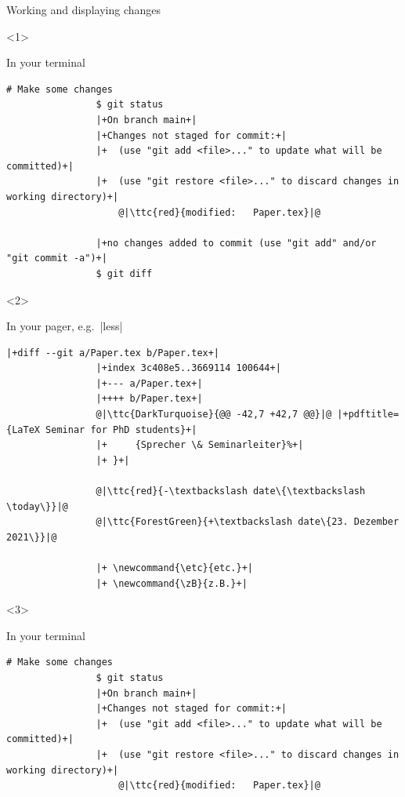 \documentclass[usenames,svgnames,14pt]{beamer}
\newcommand{\ttc}[2]{\texttt{\textcolor{#1}{#2}}}
\begin{document}
\begin{frame}[fragile]{Working and displaying changes}
    \vspace{-0.0\textheight}
    \begin{overlayarea}{\textwidth}{0.7\textheight}
        \begin{onlyenv}<1>
            \centerline{In your terminal}
            \begin{lstlisting}[style=MyBash, aboveskip=2mm, xleftmargin=-6mm, xrightmargin=-6mm]
                # Make some changes
                $ git status
                |+On branch main+|
                |+Changes not staged for commit:+|
                |+  (use "git add <file>..." to update what will be committed)+|
                |+  (use "git restore <file>..." to discard changes in working directory)+|
                    @|\ttc{red}{modified:   Paper.tex}|@

                |+no changes added to commit (use "git add" and/or "git commit -a")+|
                $ git diff
            \end{lstlisting}
        \end{onlyenv}
        \begin{onlyenv}<2>
            \centerline{In your pager, e.g.\ \bash|less|}
            \begin{lstlisting}[style=MyBash, aboveskip=2mm]
                |+diff --git a/Paper.tex b/Paper.tex+|
                |+index 3c408e5..3669114 100644+|
                |+--- a/Paper.tex+|
                |++++ b/Paper.tex+|
                @|\ttc{DarkTurquoise}{@@ -42,7 +42,7 @@}|@ |+pdftitle={LaTeX Seminar for PhD students}+|
                |+     {Sprecher \& Seminarleiter}%+|
                |+ }+|

                @|\ttc{red}{-\textbackslash date\{\textbackslash \today\}}|@
                @|\ttc{ForestGreen}{+\textbackslash date\{23. Dezember 2021\}}|@

                |+ \newcommand{\etc}{etc.}+|
                |+ \newcommand{\zB}{z.B.}+|
            \end{lstlisting}
        \end{onlyenv}
        \begin{onlyenv}<3>
            \centerline{In your terminal}
            \begin{lstlisting}[style=MyBash, aboveskip=2mm, xleftmargin=-6mm, xrightmargin=-6mm]
                # Make some changes
                $ git status
                |+On branch main+|
                |+Changes not staged for commit:+|
                |+  (use "git add <file>..." to update what will be committed)+|
                |+  (use "git restore <file>..." to discard changes in working directory)+|
                    @|\ttc{red}{modified:   Paper.tex}|@


\end{lstlisting}
\end{onlyenv}
\end{overlayarea}
\end{frame}
\end{document}
